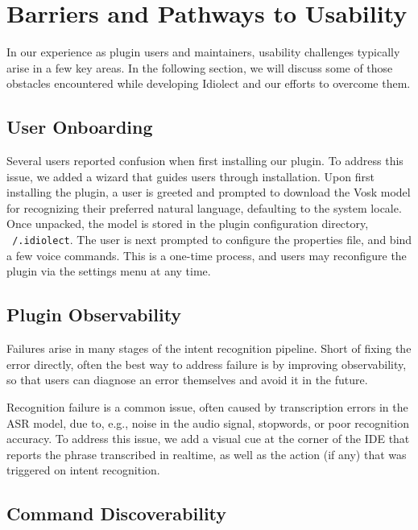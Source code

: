 \documentclass[conference]{IEEEtran}
\begin{document}
\section{Barriers and Pathways to Usability}\label{sec:usability}

In our experience as plugin users and maintainers, usability challenges typically arise in a few key areas. In the following section, we will discuss some of those obstacles encountered while developing Idiolect and our efforts to overcome them.

\subsection{User Onboarding}

Several users reported confusion when first installing our plugin. To address this issue, we added a wizard that guides users through installation. Upon first installing the plugin, a user is greeted and prompted to download the Vosk model for recognizing their preferred natural language, defaulting to the system locale. Once unpacked, the model is stored in the plugin configuration directory, \texttt{~/.idiolect}. The user is next prompted to configure the properties file, and bind a few voice commands. This is a one-time process, and users may reconfigure the plugin via the settings menu at any time.

\subsection{Plugin Observability}

Failures arise in many stages of the intent recognition pipeline. Short of fixing the error directly, often the best way to address failure is by improving observability, so that users can diagnose an error themselves and avoid it in the future.

Recognition failure is a common issue, often caused by transcription errors in the ASR model, due to, e.g., noise in the audio signal, stopwords, or poor recognition accuracy. To address this issue, we add a visual cue at the corner of the IDE that reports the phrase transcribed in realtime, as well as the action (if any) that was triggered on intent recognition.

\subsection{Command Discoverability}
\end{document}
